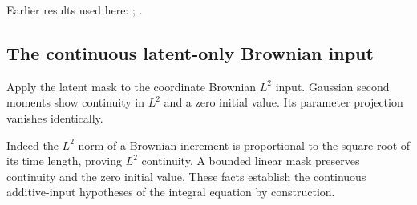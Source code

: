 \documentclass[11pt,a4paper]{report}
\begin{document}
Earlier results used here: \cite[Section~3.13.2]{LangevinLean2026ULASC}; \cite[Section~3.1.1]{LangevinLean2026IPLA}.
\subsection{\texorpdfstring{The continuous latent-only Brownian input}{The continuous latent-only Brownian input}}
\label{report-step-ProximalLangevin-MeanFieldProcess-lean-9}


Apply the latent mask to the coordinate Brownian \(L^2\) input. Gaussian second moments show continuity in \(L^2\) and a zero initial value. Its parameter projection vanishes identically.



Indeed the \(L^2\) norm of a Brownian increment is proportional to the square root of its time length, proving \(L^2\) continuity. A bounded linear mask preserves continuity and the zero initial value. These facts establish the continuous additive-input hypotheses of the integral equation by construction.
\end{document}
